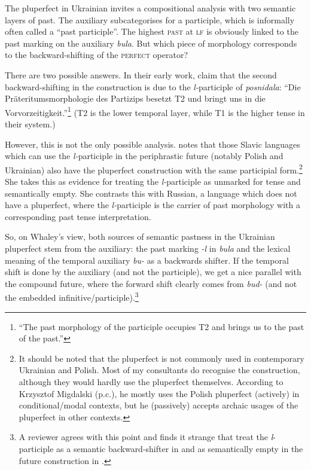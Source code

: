 \documentclass[output=paper,colorlinks,citecolor=brown]{langscibook}
\begin{document}
The pluperfect  in Ukrainian invites a compositional analysis with two semantic layers of past. The auxiliary subcategorises for a participle, which is informally often called a ``past participle''. The highest \textsc{past} at \textsc{lf} is obviously linked to  the past marking on the auxiliary {\textit{bula}}. But which piece of morphology corresponds to the backward-shifting of the \textsc{perfect} operator? 

There are two possible answers.
 In their early work, \citet[18]{stechow99} claim that the second backward-shifting in the construction is due to the {\textit{l-}}participle of \textit{posnidala}: ``Die Präteritumsmorphologie des Partizips besetzt T2 und bringt uns in die
Vorvorzeitigkeit.''\footnote{``The past morphology of the participle occupies T2 and brings us to the past of the past.''} (T2 is the lower temporal layer, while T1 is the higher tense in their system.)

However, this is not the only possible analysis. \citet[146f.]{whaley00} notes that those Slavic languages which can use the {\textit{l-}}participle in the periphrastic future (notably Polish and Ukrainian) also have the pluperfect construction with the same participial form.\footnote{It should be noted that the pluperfect is not commonly used in contemporary Ukrainian and Polish. Most of my consultants do recognise the construction, although they would hardly use the pluperfect themselves. According to Krzysztof Migdalski (p.c.), he mostly uses the Polish pluperfect (actively) in conditional/modal contexts, but he (passively) accepts archaic usages of the pluperfect in other contexts.} She takes this as evidence for treating the {\textit{l-}}participle as unmarked for tense and semantically empty.
 She contrasts this with Russian, a language which does not have a pluperfect, where the {\textit{l-}}participle is the carrier of past morphology with a corresponding past tense interpretation.

So, on Whaley's view, both sources of semantic pastness in the Ukrainian pluperfect  stem from the auxiliary: the past marking {\textit{-l}} in {\textit{bula}} and the lexical meaning of the temporal auxiliary {\textit{bu-}} as  a backwards shifter. If the temporal shift is done by the auxiliary (and not the participle), we get a nice parallel with the compound future, where the forward shift clearly comes from {\textit{bud-}} (and not the embedded infinitive/participle).\footnote{A reviewer agrees with this point and finds it strange that \citet{stechow99} treat the \textit{l}-participle as a semantic backward-shifter in  and as semantically empty in the future construction in .} 
\end{document}
